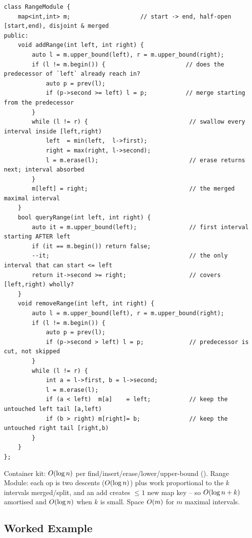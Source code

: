 \begin{lstlisting}[caption={Range Module -- disjoint intervals as an ordered map start->end (LeetCode 715)}, label={lst:c05-range}]
class RangeModule {
    map<int,int> m;                    // start -> end, half-open [start,end), disjoint & merged
public:
    void addRange(int left, int right) {
        auto l = m.upper_bound(left), r = m.upper_bound(right);
        if (l != m.begin()) {                       // does the predecessor of `left` already reach in?
            auto p = prev(l);
            if (p->second >= left) l = p;           // merge starting from the predecessor
        }
        while (l != r) {                             // swallow every interval inside [left,right)
            left  = min(left,  l->first);
            right = max(right, l->second);
            l = m.erase(l);                          // erase returns next; interval absorbed
        }
        m[left] = right;                             // the merged maximal interval
    }
    bool queryRange(int left, int right) {
        auto it = m.upper_bound(left);               // first interval starting AFTER left
        if (it == m.begin()) return false;
        --it;                                        // the only interval that can start <= left
        return it->second >= right;                  // covers [left,right) wholly?
    }
    void removeRange(int left, int right) {
        auto l = m.upper_bound(left), r = m.upper_bound(right);
        if (l != m.begin()) {
            auto p = prev(l);
            if (p->second > left) l = p;             // predecessor is cut, not skipped
        }
        while (l != r) {
            int a = l->first, b = l->second;
            l = m.erase(l);
            if (a < left)  m[a]    = left;           // keep the untouched left tail [a,left)
            if (b > right) m[right]= b;              // keep the untouched right tail [right,b)
        }
    }
};
\end{lstlisting}
\begin{complexitybox}
Container kit: $O(\log n)$ per find/insert/erase/lower/upper-bound (). Range
Module: each op is two  descents ($O(\log n)$) plus work proportional to the
$k$ intervals merged/split, and an add creates $\le 1$ new map key -- so $O(\log n + k)$ amortised
and $O(\log n)$ when $k$ is small. Space $O(m)$ for $m$ maximal intervals.
\end{complexitybox}

\subsection{Worked Example}

